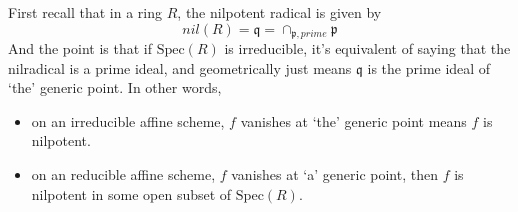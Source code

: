 \documentclass[../main.tex]{subfiles}
\begin{document}
\begin{example}
First recall that in a ring $R$, the nilpotent radical is given by 
$$nil(R)=\mathfrak{q}=\cap_{\mathfrak{p}, prime}\mathfrak{p}$$
And the point is that if $\mathrm{Spec}(R)$ is irreducible, it's equivalent of saying that the nilradical is a prime ideal, and geometrically just means $\mathfrak{q}$ is the prime ideal of `the' generic point.  In other words, 
\begin{itemize}
\item on an irreducible affine scheme, $f$ vanishes at `the' generic point means $f$ is nilpotent.
\item on an reducible affine scheme, $f$ vanishes at `a' generic point, then $f$ is nilpotent in some open subset of $\mathrm{Spec}(R)$.
\end{itemize}


\end{example}
\end{document}
